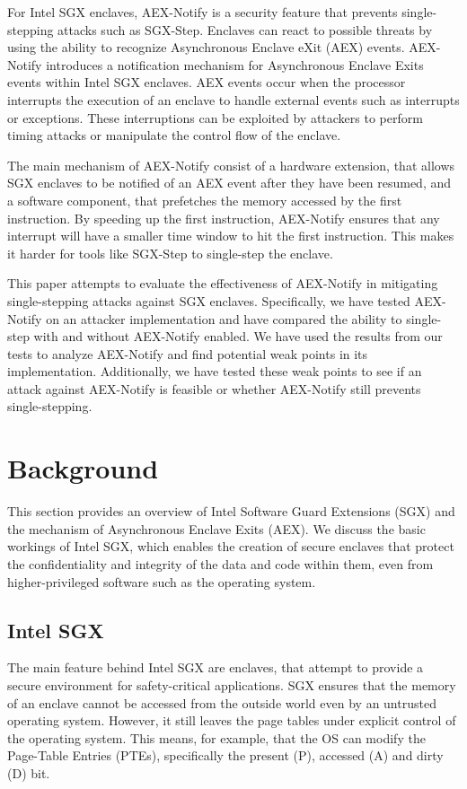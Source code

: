 \documentclass{llncs}
\begin{document}
For Intel SGX enclaves, AEX-Notify \cite{ConstableBCXXAK23} is a security feature that prevents
single-stepping attacks such as SGX-Step.
Enclaves can react to possible threats by using the ability to recognize
Asynchronous Enclave eXit (AEX) events.
AEX-Notify introduces a notification mechanism for Asynchronous Enclave Exits
events within Intel SGX enclaves.
AEX events occur when the processor interrupts the execution of an enclave to
handle external events such as interrupts or exceptions.
These interruptions can be exploited by attackers to perform timing attacks or
manipulate the control flow of the enclave.

The main mechanism of AEX-Notify consist of a hardware extension, that allows
SGX enclaves to be notified of an AEX event after they have been resumed, and a
software component, that prefetches the memory accessed by the first
instruction.
By speeding up the first instruction, AEX-Notify ensures that
any interrupt will have a smaller time window to hit the first instruction.
This makes it harder for tools like SGX-Step to single-step the enclave.

This paper attempts to evaluate the effectiveness of AEX-Notify in mitigating
single-stepping attacks against SGX enclaves.
Specifically, we have tested AEX-Notify on an attacker implementation and have
compared the ability to single-step with and without AEX-Notify enabled.
We have used the results from our tests to analyze AEX-Notify and find
potential weak points in its implementation.
Additionally, we have tested these weak points to see if an attack against
AEX-Notify is feasible or whether AEX-Notify still prevents single-stepping.

\section{Background}

This section provides an overview of Intel Software Guard Extensions (SGX) and
the mechanism of Asynchronous Enclave Exits (AEX).
We discuss the basic workings of Intel SGX, which enables the creation of
secure enclaves that protect the confidentiality and integrity of the data and
code within them, even from higher-privileged software such as the operating
system.

\subsection{Intel SGX}

The main feature behind Intel SGX are enclaves, that attempt to provide a
secure environment for safety-critical applications.
SGX ensures that the memory of an enclave cannot be accessed from the outside
world even by an untrusted operating system.
However, it still leaves the page tables under explicit control of the
operating system.
This means, for example, that the OS can modify the Page-Table Entries (PTEs),
specifically the present (P), accessed (A) and dirty (D) bit.
\end{document}
